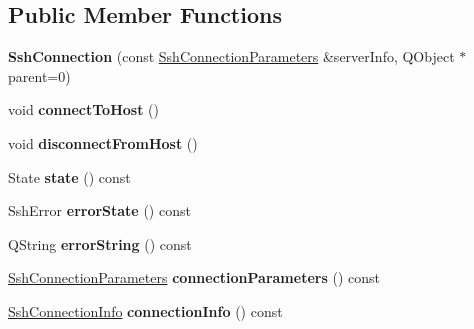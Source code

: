\subsection*{Public Member Functions}
\begin{DoxyCompactItemize}
\item 
\mbox{\label{class_q_ssh_1_1_ssh_connection_a6649ddbd7cb9f470283d6fe154b51468}} 
{\bfseries Ssh\+Connection} (const \mbox{\hyperlink{class_q_ssh_1_1_ssh_connection_parameters}{Ssh\+Connection\+Parameters}} \&server\+Info, Q\+Object $\ast$parent=0)
\item 
\mbox{\label{class_q_ssh_1_1_ssh_connection_a3d5290a78867e081b5acc500de7e0a22}} 
void {\bfseries connect\+To\+Host} ()
\item 
\mbox{\label{class_q_ssh_1_1_ssh_connection_a8cb8e863458015ca80a6e3474b0e666a}} 
void {\bfseries disconnect\+From\+Host} ()
\item 
\mbox{\label{class_q_ssh_1_1_ssh_connection_a1d3b8cc17a09ee78a4a24764f25b56cd}} 
State {\bfseries state} () const
\item 
\mbox{\label{class_q_ssh_1_1_ssh_connection_a72aaab403c18619416279747a34029c9}} 
Ssh\+Error {\bfseries error\+State} () const
\item 
\mbox{\label{class_q_ssh_1_1_ssh_connection_ac9ec3c8db5c50b7853632a26fb86345f}} 
Q\+String {\bfseries error\+String} () const
\item 
\mbox{\label{class_q_ssh_1_1_ssh_connection_afcfc0a988faf0c2240abfc2fbc739aec}} 
\mbox{\hyperlink{class_q_ssh_1_1_ssh_connection_parameters}{Ssh\+Connection\+Parameters}} {\bfseries connection\+Parameters} () const
\item 
\mbox{\label{class_q_ssh_1_1_ssh_connection_a5d83634fa02db2aed34347f16b9d5a2a}} 
\mbox{\hyperlink{class_q_ssh_1_1_ssh_connection_info}{Ssh\+Connection\+Info}} {\bfseries connection\+Info} () const
\item 
\mbox{\label{class_q_ssh_1_1_ssh_connection_a7a23b1b028c619dd30336e820b692f17}} 

\end{DoxyCompactItemize}
